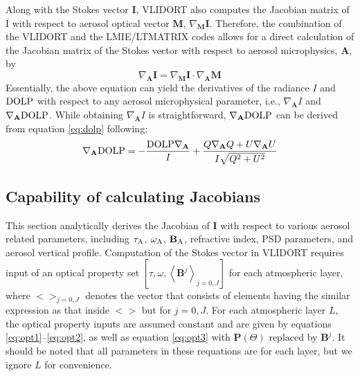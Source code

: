Along with the Stokes vector $\mathbf{I}$, VLIDORT also computes the Jacobian
matrix of I with respect to aerosol optical vector $\mathbf{M}$, 
$\nabla_\mathbf{M}\mathbf{I}$. Therefore,
the combination of the VLIDORT and the LMIE/LTMATRIX codes allows for a
direct calculation of the Jacobian matrix of the Stokes vector with
respect to aerosol microphysics, $\mathbf{A}$, by
\begin{equation}
\nabla_\mathbf{A}\mathbf{I} = \nabla_\mathbf{M}\mathbf{I}
\cdot \nabla_\mathbf{A}\mathbf{M} \label{eq:adj-i}
\end{equation}
Essentially, the above equation can yield the derivatives of the
radiance $I$ and $\text{DOLP}$ with respect to any aerosol microphysical parameter,
i.e., $\nabla_\mathbf{A}I$ and $\nabla_\mathbf{A}\text{DOLP}$. 
While obtaining $\nabla_\mathbf{A}I$ is straightforward,
$\nabla_\mathbf{A}\text{DOLP}$ can be derived from equation \eqref{eq:dolp} 
following:
\begin{equation}
\nabla_\mathbf{A}\text{DOLP} = -\frac{\text{DOLP} \nabla_\mathbf{A}}{I} +
\frac{Q\nabla_\mathbf{A}{Q}+U\nabla_\mathbf{A}{U}}{I\sqrt{Q^2+U^2}}
\label{eq:adj-dolp}
\end{equation}

\subsection{Capability of calculating Jacobians} \label{subsec:jacobian}

This section analytically derives the Jacobian of $\mathbf{I}$ with
respect to various aerosol related parameters, including $\tau_\text{A}$,
$\omega_\text{A}$, $\mathbf{B}_\text{A}$, refractive index, PSD parameters, and aerosol vertical
profile. Computation of the Stokes vector in VLIDORT requires input of
an optical property set $[\tau,\omega,\left<\mathbf{B}^j\right>_{j=0,J}]$ for
each atmospheric layer, where $<>_{j=0,J}$ denotes the vector that
consists of elements having the similar expression as that inside $<>$
but for $j=0, J$. For each atmospheric layer $L$, the optical property
inputs are assumed constant and are given by equations 
\eqref{eq:opt1}--\eqref{eq:opt2}, as well as equation \eqref{eq:opt3}
with $\mathbf{P}(\Theta)$ replaced by $\mathbf{B}^j$. 
It should be noted that all parameters
in these requations are for each layer, but we ignore $L$ for
convenience.

